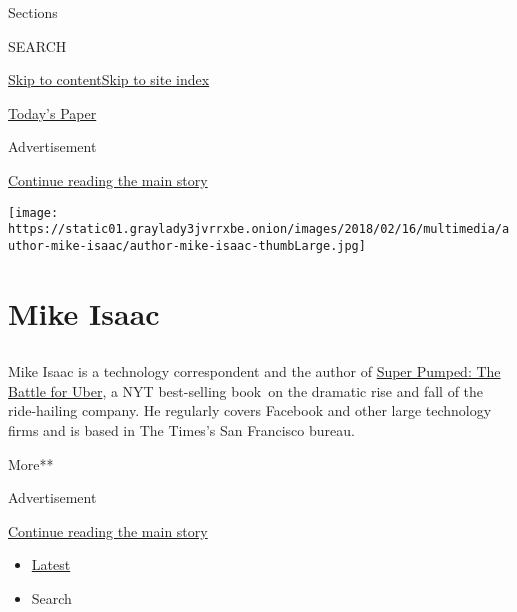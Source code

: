 Sections

SEARCH

\protect\hyperlink{site-content}{Skip to
content}\protect\hyperlink{site-index}{Skip to site index}

\href{https://myaccount.nytimes3xbfgragh.onion/auth/login?response_type=cookie\&client_id=vi}{}

\href{https://www.nytimes3xbfgragh.onion/section/todayspaper}{Today's
Paper}

Advertisement

\protect\hyperlink{after-top}{Continue reading the main story}

\texttt{[image: https://static01.graylady3jvrrxbe.onion/images/2018/02/16/multimedia/author-mike-isaac/author-mike-isaac-thumbLarge.jpg]}

\hypertarget{mike-isaac}{%
\section{Mike Isaac}\label{mike-isaac}}

\subsection{}

Mike Isaac is a technology correspondent and the author of
\href{https://www.amazon.com/gp/product/0393652246/ref=dbs_a_def_rwt_hsch_vapi_taft_p1_i0}{Super
Pumped: The Battle for Uber}, a NYT best-selling book~on the dramatic
rise and fall of the ride-hailing company. He regularly covers Facebook
and other large technology firms and is based in The Times's San
Francisco bureau.

More**

Advertisement

\protect\hyperlink{after-mid1}{Continue reading the main story}

\begin{itemize}
\tightlist
\item
  \protect\hyperlink{stream-panel}{Latest}
\item
  Search
\end{itemize}

